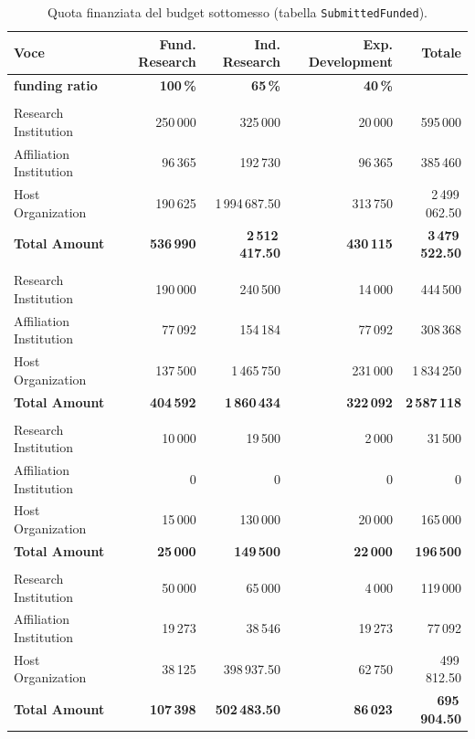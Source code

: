 \documentclass{plan4ari_report}
\begin{document}
\begin{table}[H]\centering\small
\caption{Quota finanziata del budget sottomesso (tabella \texttt{SubmittedFunded}).}\label{tab:sub-fund}
\begin{tabular}{lrrrr}\toprule
\textbf{Voce} & \textbf{Fund. Research} & \textbf{Ind. Research} & \textbf{Exp. Development} & \textbf{Totale} \\\midrule
\textbf{funding ratio} & \textbf{100\,\%} & \textbf{65\,\%} & \textbf{40\,\%} &  \\
\addlinespace[2pt]\multicolumn{5}{l}{\textit{\textbf{TOTAL COSTS}}} \\
\quad Research Institution & 250\,000 & 325\,000 & 20\,000 & 595\,000 \\
\quad Affiliation Institution & 96\,365 & 192\,730 & 96\,365 & 385\,460 \\
\quad Host Organization & 190\,625 & 1\,994\,687.50 & 313\,750 & 2\,499\,062.50 \\
\midrule
\textbf{Total Amount} & \textbf{536\,990} & \textbf{2\,512\,417.50} & \textbf{430\,115} & \textbf{3\,479\,522.50} \\
\addlinespace[2pt]\multicolumn{5}{l}{\textit{\textbf{PERSONNEL}}} \\
\quad Research Institution & 190\,000 & 240\,500 & 14\,000 & 444\,500 \\
\quad Affiliation Institution & 77\,092 & 154\,184 & 77\,092 & 308\,368 \\
\quad Host Organization & 137\,500 & 1\,465\,750 & 231\,000 & 1\,834\,250 \\
\midrule
\textbf{Total Amount} & \textbf{404\,592} & \textbf{1\,860\,434} & \textbf{322\,092} & \textbf{2\,587\,118} \\
\addlinespace[2pt]\multicolumn{5}{l}{\textit{\textbf{DIRECT OTHER COSTS}}} \\
\quad Research Institution & 10\,000 & 19\,500 & 2\,000 & 31\,500 \\
\quad Affiliation Institution & 0 & 0 & 0 & 0 \\
\quad Host Organization & 15\,000 & 130\,000 & 20\,000 & 165\,000 \\
\midrule
\textbf{Total Amount} & \textbf{25\,000} & \textbf{149\,500} & \textbf{22\,000} & \textbf{196\,500} \\
\addlinespace[2pt]\multicolumn{5}{l}{\textit{\textbf{INDIRECT COSTS}}} \\
\quad Research Institution & 50\,000 & 65\,000 & 4\,000 & 119\,000 \\
\quad Affiliation Institution & 19\,273 & 38\,546 & 19\,273 & 77\,092 \\
\quad Host Organization & 38\,125 & 398\,937.50 & 62\,750 & 499\,812.50 \\
\midrule
\textbf{Total Amount} & \textbf{107\,398} & \textbf{502\,483.50} & \textbf{86\,023} & \textbf{695\,904.50} \\
\bottomrule\end{tabular}
\end{table}
\end{document}
